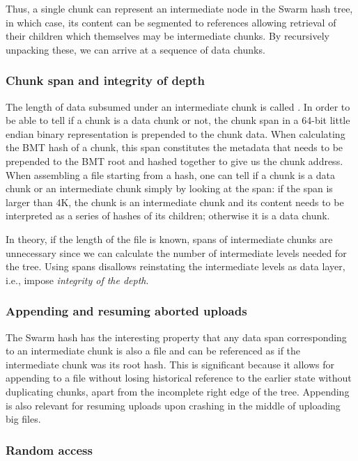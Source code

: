 Thus, a single chunk can represent an intermediate node in the Swarm hash tree, in which case, its content can be segmented to references allowing retrieval of their children which themselves may be intermediate chunks. By recursively unpacking these, we can arrive at a sequence of data chunks. 

\subsubsection{Chunk span and integrity of depth}

The length of data subsumed under an intermediate chunk is called . In order to be able to tell if a chunk is a data chunk or not, the chunk span in a 64-bit little endian binary representation is prepended to the chunk data.  When calculating the BMT hash of a chunk, this span constitutes the metadata that needs to be prepended to the BMT root and hashed together to give us the chunk address. When assembling a file starting from a hash, one can tell if a chunk is a data chunk or an intermediate chunk simply by looking at the span: if the span is larger than 4K, the chunk is an intermediate chunk and its content needs to be interpreted as a series of hashes of its children; otherwise it is a data chunk.

In theory, if the length of the file is known, spans of intermediate chunks are unnecessary since we can calculate the number of intermediate levels needed for the tree. Using spans disallows reinstating the intermediate levels as data layer, i.e., impose \emph{integrity of the depth}. 

\subsubsection{Appending and resuming aborted uploads}

The Swarm hash has the interesting property that any data span corresponding to an intermediate chunk is also a file and can be referenced as if the intermediate chunk was its root hash. This is significant because it allows for appending to a file without losing historical reference to the earlier state without duplicating chunks, apart from the incomplete right edge of the tree. Appending is also relevant for resuming uploads upon crashing in the middle of uploading big files.

\subsubsection{Random access}

